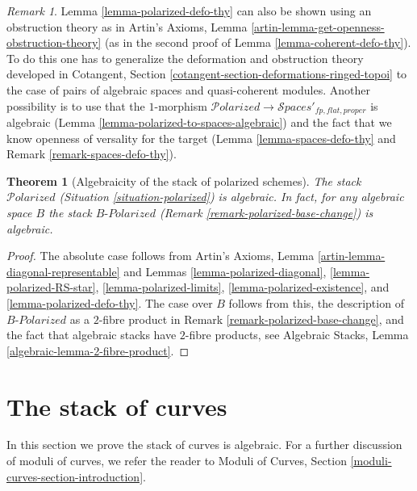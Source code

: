 \documentclass{stacks-project}
\theoremstyle{plain}
\newtheorem{theorem}[subsection]{Theorem}
\theoremstyle{definition}
\theoremstyle{remark}
\newtheorem{remark}[subsection]{Remark}
\numberwithin{equation}{subsection}
\def\Spacesstack{\mathcal{S}\!\mathit{paces}}
\def\Polarizedstack{\mathcal{P}\!\mathit{olarized}}
\begin{document}
\begin{remark}
\label{remark-polarized-defo-thy}
Lemma \ref{lemma-polarized-defo-thy} can also be shown
using an obstruction theory as in
Artin's Axioms, Lemma \ref{artin-lemma-get-openness-obstruction-theory}
(as in the second proof of Lemma \ref{lemma-coherent-defo-thy}).
To do this one has to generalize the deformation and obstruction theory
developed in
Cotangent, Section \ref{cotangent-section-deformations-ringed-topoi}
to the case of pairs of algebraic spaces and quasi-coherent modules.
Another possibility is to use that the $1$-morphism
$\Polarizedstack \to \Spacesstack'_{fp, flat, proper}$
is algebraic (Lemma \ref{lemma-polarized-to-spaces-algebraic})
and the fact that we know openness of versality for the target
(Lemma \ref{lemma-spaces-defo-thy} and
Remark \ref{remark-spaces-defo-thy}).
\end{remark}

\begin{theorem}[Algebraicity of the stack of polarized schemes]
\label{theorem-polarized-algebraic}
The stack $\Polarizedstack$ (Situation \ref{situation-polarized})
is algebraic. In fact, for any algebraic space $B$ the stack
$B\textit{-Polarized}$ (Remark \ref{remark-polarized-base-change})
is algebraic.
\end{theorem}

\begin{proof}
The absolute case follows from
Artin's Axioms, Lemma \ref{artin-lemma-diagonal-representable}
and Lemmas \ref{lemma-polarized-diagonal},
\ref{lemma-polarized-RS-star},
\ref{lemma-polarized-limits},
\ref{lemma-polarized-existence}, and
\ref{lemma-polarized-defo-thy}.
The case over $B$ follows from this, the description of
$B\textit{-Polarized}$ as a $2$-fibre product in
Remark \ref{remark-polarized-base-change}, and the fact
that algebraic stacks have $2$-fibre products, see
Algebraic Stacks, Lemma \ref{algebraic-lemma-2-fibre-product}.
\end{proof}











\section{The stack of curves}
\label{section-curves}

\noindent
In this section we prove the stack of curves is algebraic. For
a further discussion of moduli of curves, we refer the reader
to Moduli of Curves, Section \ref{moduli-curves-section-introduction}.
\end{document}
